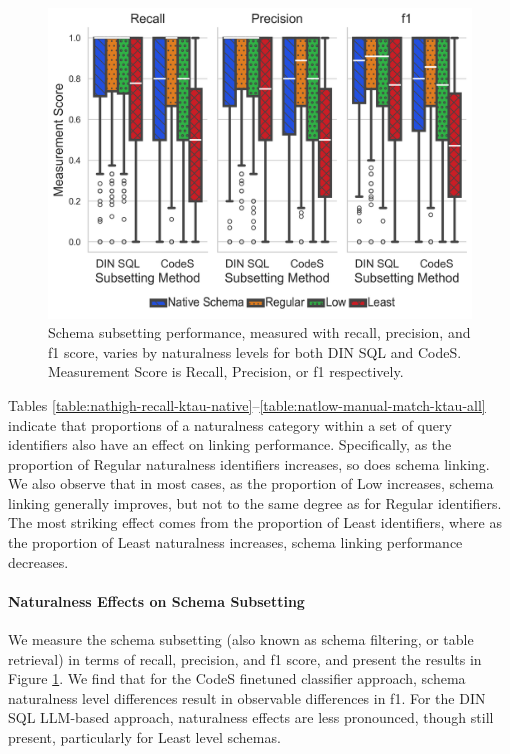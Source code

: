 \begin{figure}
  \centering
  \includegraphics[width=\figwidthmod\linewidth]{figures/dinsql_codes_subsetting_performance.png}
  \caption{Schema subsetting performance, measured with recall, precision, and  f1 score, varies by naturalness levels for both DIN SQL and CodeS. Measurement Score is Recall, Precision, or f1 respectively.}
  \label{fig:subsettingperformance}
\end{figure}

Tables \ref{table:nathigh-recall-ktau-native}--\ref{table:natlow-manual-match-ktau-all} indicate that proportions of a naturalness category within a set of query identifiers also have an effect on linking performance.
Specifically, as the proportion of Regular naturalness identifiers increases, so does schema linking.
We also observe that in most cases, as the proportion of Low increases, schema linking generally improves, but not to the same degree as for Regular identifiers.
The most striking effect comes from the proportion of Least identifiers, where as the proportion of Least naturalness increases, schema linking performance decreases. 

\paragraph{\textbf{Naturalness Effects on Schema Subsetting}}
We measure the schema subsetting (also known as schema filtering, or table retrieval) in terms of recall, precision, and f1 score, and present the results in Figure \ref{fig:subsettingperformance}.
We find that for the CodeS finetuned classifier approach, schema naturalness level differences result in observable differences in f1.
For the DIN SQL LLM-based approach, naturalness effects are less pronounced, though still present, particularly for Least level schemas.

